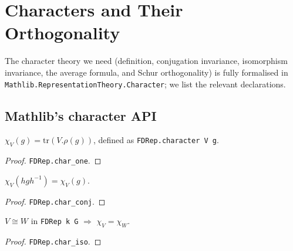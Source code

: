 \chapter{Characters and Their Orthogonality}
\label{chap:characters}

The character theory we need (definition, conjugation invariance, isomorphism
invariance, the average formula, and Schur orthogonality) is fully formalised
in \texttt{Mathlib.RepresentationTheory.Character}; we list the relevant
declarations.

\section{Mathlib's character API}
\label{sec:char-mathlib}

\begin{definition}
  \label{def:character}
  \mathlibok
  $\chi_V(g) = \mathrm{tr}(V.\rho(g))$, defined as
  \texttt{FDRep.character V g}.
\end{definition}

\begin{lemma}[$\chi_V(1) = \dim V$]
  \label{lem:char-one}
  \mathlibok
  \leanok
\end{lemma}

\begin{proof}\leanok{}
  \texttt{FDRep.char\_one}.
\end{proof}

\begin{lemma}
  \label{lem:char-conj}
  \mathlibok
  \leanok
  $\chi_V(hgh^{-1}) = \chi_V(g)$.
\end{lemma}

\begin{proof}\leanok{}
  \texttt{FDRep.char\_conj}.
\end{proof}

\begin{lemma}
  \label{lem:char-iso}
  \mathlibok
  \leanok
  $V \cong W$ in \texttt{FDRep k G} $\Rightarrow$ $\chi_V = \chi_W$.
\end{lemma}

\begin{proof}\leanok{}
  \texttt{FDRep.char\_iso}.
\end{proof}

